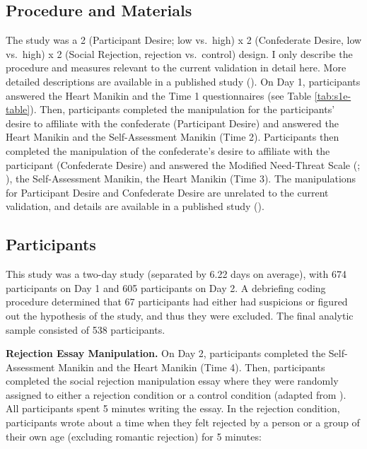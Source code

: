 \documentclass[
]{udthesis}
\begin{document}
\subsection{Procedure and Materials}\label{procedure-and-materials-4}

The study was a 2 (Participant Desire; low vs.~high) x 2 (Confederate
Desire, low vs.~high) x 2 (Social Rejection, rejection vs.~control)
design. I only describe the procedure and measures relevant to the
current validation in detail here. More detailed descriptions are
available in a published study (). On Day 1, participants
answered the Heart Manikin and the Time 1 questionnaires (see Table
\ref{tab:s1e-table}). Then, participants completed the manipulation for
the participants' desire to affiliate with the confederate (Participant
Desire) and answered the Heart Manikin and the Self-Assessment Manikin
(Time 2). Participants then completed the manipulation of the
confederate's desire to affiliate with the participant (Confederate
Desire) and answered the Modified Need-Threat Scale (; ), the Self-Assessment Manikin, the Heart Manikin (Time 3).
The manipulations for Participant Desire and Confederate Desire are
unrelated to the current validation, and details are available in a
published study ().

\subsection{Participants}\label{participants-4}

This study was a two-day study (separated by 6.22 days on average), with 674 participants on Day 1 and 605
participants on Day 2. A debriefing coding procedure determined that 67
participants had either had suspicions or figured out the hypothesis of
the study, and thus they were excluded. The final analytic sample
consisted of 538 participants.

\textbf{Rejection Essay Manipulation.} On Day 2, participants completed the
Self-Assessment Manikin and the Heart Manikin (Time 4). Then,
participants completed the social rejection manipulation essay where
they were randomly assigned to either a rejection condition or a control
condition (adapted from ). All participants spent
5 minutes writing the essay. In the rejection condition, participants
wrote about a time when they felt rejected by a person or a group of
their own age (excluding romantic rejection) for 5 minutes:
\end{document}
